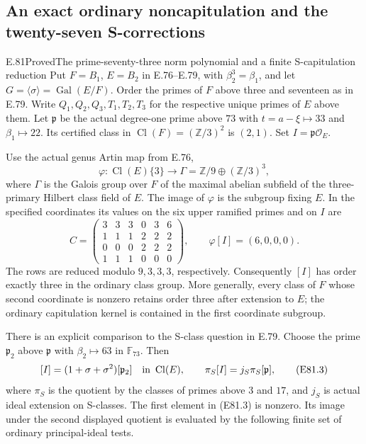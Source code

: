 \subsection{An exact ordinary noncapitulation and the twenty-seven S-corrections}

\begin{statement}{E.81}{Proved}{The prime-seventy-three norm polynomial and a finite S-capitulation reduction}
Put $F=B_1$, $E=B_2$ in E.76--E.79, with
$\beta_2^3=\beta_1$, and let
$G=\langle\sigma\rangle=\operatorname{Gal}(E/F)$.
Order the primes of $F$ above three and seventeen as in E.79.
Write $Q_1,Q_2,Q_3,T_1,T_2,T_3$ for the respective unique
primes of $E$ above them. Let $\mathfrak p$ be the actual
degree-one prime above $73$ with $t=a-\xi\mapsto33$ and
$\beta_1\mapsto22$. Its certified class in
$\operatorname{Cl}(F)=(\mathbb Z/3)^2$ is $(2,1)$.
Set $I=\mathfrak p\mathcal O_E$.

Use the actual genus Artin map from E.76,
\[
 \varphi:\operatorname{Cl}(E)\{3\}\longrightarrow
 \Gamma=\mathbb Z/9\oplus(\mathbb Z/3)^3,
 \tag{E81.1}
\]
where $\Gamma$ is the Galois group over $F$ of the maximal
abelian subfield of the three-primary Hilbert class field of
$E$. The image of $\varphi$ is the subgroup fixing $E$.
In the specified coordinates its values on the six upper
ramified primes and on $I$ are
\[
 C=\begin{pmatrix}
 3&3&3&0&3&6\\
 1&1&1&2&2&2\\
 0&0&0&2&2&2\\
 1&1&1&0&0&0
 \end{pmatrix},\qquad
 \varphi[I]=(6,0,0,0).
 \tag{E81.2}
\]
The rows are reduced modulo $9,3,3,3$, respectively.
Consequently $[I]$ has order exactly three in the ordinary
class group. More generally, every class of $F$ whose second
coordinate is nonzero retains order three after extension to
$E$; the ordinary capitulation kernel is contained in the
first coordinate subgroup.

There is an explicit comparison to the S-class question in
E.79. Choose the prime $\mathfrak p_2$ above $\mathfrak p$
with $\beta_2\mapsto63$ in $\mathbb F_{73}$. Then
\[
 [I]=(1+\sigma+\sigma^2)[\mathfrak p_2]
   \quad\hbox{in }\operatorname{Cl}(E),\qquad
 \pi_S[I]=j_S\pi_S[\mathfrak p],
 \tag{E81.3}
\]
where $\pi_S$ is the quotient by the classes of primes above
$3$ and $17$, and $j_S$ is actual ideal extension on S-classes.
The first element in (E81.3) is nonzero. Its image under the
second displayed quotient is evaluated by the following
finite set of ordinary principal-ideal tests.


\end{statement}
